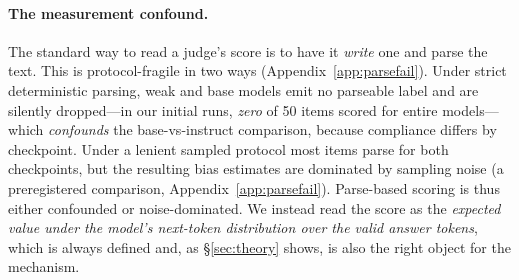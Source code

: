 \documentclass[11pt]{article}
\begin{document}
\paragraph{The measurement confound.} The standard way to read a judge's score is to
have it \emph{write} one and parse the text. This is protocol-fragile in two ways
(Appendix~\ref{app:parsefail}). Under strict deterministic parsing, weak and base
models emit no parseable label and are silently dropped---in our initial runs,
\emph{zero} of 50 items scored for entire models---which \emph{confounds} the
base-vs-instruct comparison, because compliance differs by checkpoint. Under a
lenient sampled protocol most items parse for both checkpoints, but the resulting
bias estimates are dominated by sampling noise (a preregistered comparison,
Appendix~\ref{app:parsefail}). Parse-based scoring is thus either confounded or
noise-dominated. We instead read
the score as the \emph{expected value under the model's next-token distribution over
the valid answer tokens}, which is always defined and, as \S\ref{sec:theory} shows, is
also the right object for the mechanism.
\end{document}
